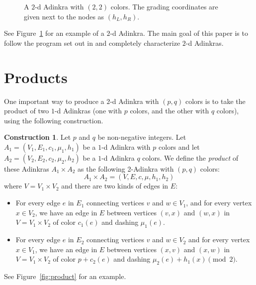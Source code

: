 \documentclass[12pt,twoside,singlespace]{article}
\numberwithin{equation}{section}
\theoremstyle{definition}
\newtheorem{construction}[equation]{Construction}
\begin{document}
\begin{figure}[htb]
\begin{center}
\caption{A $2$-d Adinkra with $(2,2)$ colors. The grading coordinates are given next to the nodes as $(h_L, h_R)$. \label{fig:2d-example}}
\end{center}
\end{figure}

See Figure~\ref{fig:2d-example} for an example of a $2$-d Adinkra. The main goal of this paper is to follow the program set out in \cite{hubsch:weaving} and completely characterize $2$-d Adinkras.

\section{Products}
\label{sec:products}
One important way to produce a $2$-d Adinkra with $(p,q)$ colors is to take the product of two $1$-d Adinkras (one with $p$ colors, and the other with $q$ colors), using the following construction.

\begin{construction}
\label{const:product}
Let $p$ and $q$ be non-negative integers.  Let $A_1=(V_1, E_1, c_1, \mu_1,h_1)$ be a $1$-d Adinkra with $p$ colors and let $A_2=(V_2, E_2, c_2, \mu_2,h_2)$ be a $1$-d Adinkra $q$ colors.  We define the \emph{product} of these Adinkras $A_1\times A_2$ as the following 2-Adinkra with $(p,q)$ colors:
\[A_1\times A_2=(V,E,c,\mu,h_1,h_2)\]
where $V=V_1\times V_2$ and there are two kinds of edges in $E$:
\begin{itemize}
\item For every edge $e$ in $E_1$ connecting vertices $v$ and $w\in V_1$, and for every vertex $x\in V_2$, we have an edge in $E$ between vertices $(v,x)$ and $(w,x)$ in $V=V_1\times V_2$ of color $c_1(e)$ and dashing $\mu_1(e)$.
\item For every edge $e$ in $E_2$ connecting vertices $v$ and $w\in V_2$ and for every vertex $x\in V_1$, we have an edge in $E$ between vertices $(x,v)$ and $(x,w)$ in $V=V_1\times V_2$ of color $p+c_2(e)$ and dashing $\mu_2(e)+h_1(x)\pmod{2}$.
\end{itemize}
 See Figure~\ref{fig:product} for an example.
\end{construction}
\end{document}
